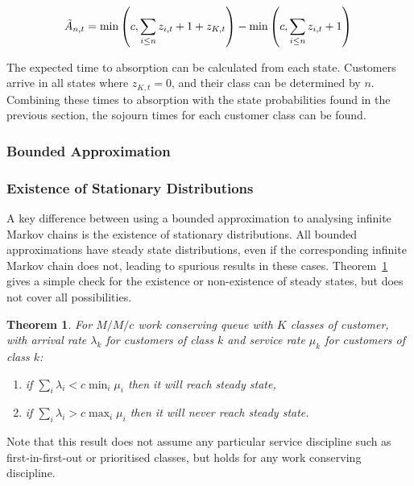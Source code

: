 \documentclass{article}
\newtheorem{theorem}{Theorem}
\begin{document}
\begin{equation}\label{eqn:inservice_adapt_tilde}
\tilde{A}_{n,t} =
\min\left(c, \sum_{i \leq n} z_{i,t} + 1 + z_{K,t}\right) - \min\left(c, \sum_{i \leq n} z_{i,t} + 1\right) \\
\end{equation}


The expected time to absorption can be calculated from each state.
Customers arrive in all states where $z_{K,t} = 0$, and their class can be
determined by $n$. Combining these times to absorption with the state
probabilities found in the previous section, the sojourn times for each customer
class can be found.


\subsubsection{Bounded Approximation}\label{sec:bound}

\subsubsection{Existence of Stationary Distributions}\label{sec:stationary}
A key difference between using a bounded approximation to analysing infinite
Markov chains is the existence of stationary distributions. All bounded
approximations have steady state distributions, even if the corresponding
infinite Markov chain does not, leading to spurious results in these cases.
Theorem~\ref{thrm:steadystate} gives a simple check for the existence or
non-existence of steady states, but does not cover all possibilities.

\begin{theorem}\label{thrm:steadystate}
For $M/M/c$ work conserving queue with $K$ classes of customer, with arrival
rate $\lambda_k$ for customers of class $k$ and service rate $\mu_k$ for
customers of class $k$:
\begin{enumerate}
  \item if $\sum_i \lambda_i < c \min_i \mu_i$ then it will reach steady state,
  \item if $\sum_i \lambda_i > c \max_i \mu_i$ then it will never reach steady state.
\end{enumerate}
\end{theorem}

Note that this result does not assume any particular service discipline such as
first-in-first-out or prioritised classes, but holds for any work conserving
discipline.
\end{document}
